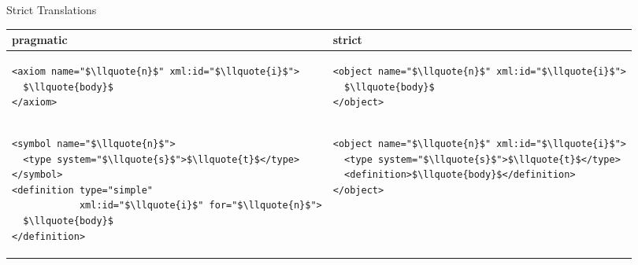\begin{omgroup}[short=Mathematical Statements,id=statements]
\begin{omgroup}[id=st.strict]{Strict Translations}
\begin{center}\lstset{frame=none,numbers=none,lineskip=-.7ex,aboveskip=-.5em,belowskip=-1em}
  \begin{tabular}{|p{6cm}|p{6cm}|}\hline
    pragmatic & strict\\\hline
{
\begin{lstlisting}[numbers=none,frame=none,mathescape]
<axiom name="$\llquote{n}$" xml:id="$\llquote{i}$">
  $\llquote{body}$
</axiom>
\end{lstlisting}
}&{
\begin{lstlisting}[numbers=none,frame=none,mathescape]
<object name="$\llquote{n}$" xml:id="$\llquote{i}$">
  $\llquote{body}$
</object>
\end{lstlisting}
}\\\hline{
\begin{lstlisting}[numbers=none,frame=none,mathescape]
<symbol name="$\llquote{n}$">
  <type system="$\llquote{s}$">$\llquote{t}$</type>
</symbol>
<definition type="simple"
            xml:id="$\llquote{i}$" for="$\llquote{n}$">
  $\llquote{body}$
</definition>
\end{lstlisting}
}&{
\begin{lstlisting}[numbers=none,frame=none,mathescape]
<object name="$\llquote{n}$" xml:id="$\llquote{i}$">
  <type system="$\llquote{s}$">$\llquote{t}$</type>
  <definition>$\llquote{body}$</definition>
</object>
\end{lstlisting}
}\\\hline 
\end{tabular}
\end{center}
\end{omgroup}
\end{omgroup}


